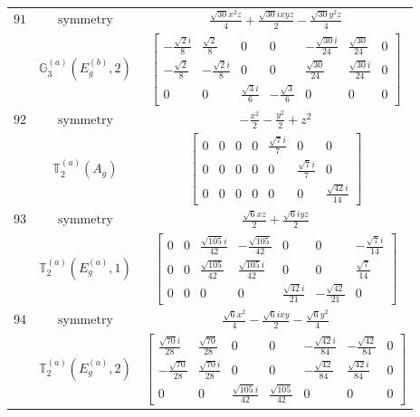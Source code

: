 \documentclass[fleqn,8pt,landscape]{jsarticle}
\begin{document}
\begin{longtable}{ccc}
$ 91 $ & $ \text{symmetry} $ & $ \frac{\sqrt{30} x^{2} z}{4} + \frac{\sqrt{30} i x y z}{2} - \frac{\sqrt{30} y^{2} z}{4} $ \\
$  $ & $ \mathbb{G}_{3}^{(a)}(E_{g}^{(b)},2) $ & $ \begin{bmatrix} - \frac{\sqrt{2} i}{8} & \frac{\sqrt{2}}{8} & 0 & 0 & - \frac{\sqrt{30} i}{24} & \frac{\sqrt{30}}{24} & 0 \\ - \frac{\sqrt{2}}{8} & - \frac{\sqrt{2} i}{8} & 0 & 0 & \frac{\sqrt{30}}{24} & \frac{\sqrt{30} i}{24} & 0 \\ 0 & 0 & \frac{\sqrt{3} i}{6} & - \frac{\sqrt{3}}{6} & 0 & 0 & 0 \end{bmatrix} $ \\ \hline
$ 92 $ & $ \text{symmetry} $ & $ - \frac{x^{2}}{2} - \frac{y^{2}}{2} + z^{2} $ \\
$  $ & $ \mathbb{T}_{2}^{(a)}(A_{g}) $ & $ \begin{bmatrix} 0 & 0 & 0 & 0 & \frac{\sqrt{7} i}{7} & 0 & 0 \\ 0 & 0 & 0 & 0 & 0 & \frac{\sqrt{7} i}{7} & 0 \\ 0 & 0 & 0 & 0 & 0 & 0 & \frac{\sqrt{42} i}{14} \end{bmatrix} $ \\ \hline
$ 93 $ & $ \text{symmetry} $ & $ \frac{\sqrt{6} x z}{2} + \frac{\sqrt{6} i y z}{2} $ \\
$  $ & $ \mathbb{T}_{2}^{(a)}(E_{g}^{(a)},1) $ & $ \begin{bmatrix} 0 & 0 & \frac{\sqrt{105} i}{42} & - \frac{\sqrt{105}}{42} & 0 & 0 & - \frac{\sqrt{7} i}{14} \\ 0 & 0 & \frac{\sqrt{105}}{42} & \frac{\sqrt{105} i}{42} & 0 & 0 & \frac{\sqrt{7}}{14} \\ 0 & 0 & 0 & 0 & \frac{\sqrt{42} i}{21} & - \frac{\sqrt{42}}{21} & 0 \end{bmatrix} $ \\ \hline
$ 94 $ & $ \text{symmetry} $ & $ \frac{\sqrt{6} x^{2}}{4} - \frac{\sqrt{6} i x y}{2} - \frac{\sqrt{6} y^{2}}{4} $ \\
$  $ & $ \mathbb{T}_{2}^{(a)}(E_{g}^{(a)},2) $ & $ \begin{bmatrix} \frac{\sqrt{70} i}{28} & \frac{\sqrt{70}}{28} & 0 & 0 & - \frac{\sqrt{42} i}{84} & - \frac{\sqrt{42}}{84} & 0 \\ - \frac{\sqrt{70}}{28} & \frac{\sqrt{70} i}{28} & 0 & 0 & - \frac{\sqrt{42}}{84} & \frac{\sqrt{42} i}{84} & 0 \\ 0 & 0 & \frac{\sqrt{105} i}{42} & \frac{\sqrt{105}}{42} & 0 & 0 & 0 \end{bmatrix} $ \\ \hline

\end{longtable}
\end{document}

